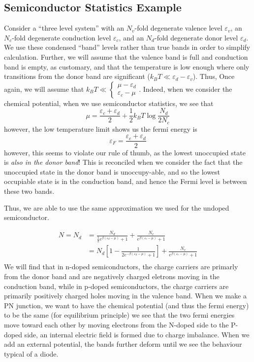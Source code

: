 \subsection{Semiconductor Statistics Example}
Consider a ``three level system'' with an \(N_v\)-fold degenerate valence level \(\varepsilon_v\), an \(N_c\)-fold degenerate conduction level \(\varepsilon_c\), and an \(N_d\)-fold degenerate donor level \(\varepsilon_d\). We use these condensed ``band'' levels rather than true bands in order to simplify calculation. Further, we will assume that the valence band is full and conduction band is empty, as customary, and that the temperature is low enough where only transitions from the donor band are significant (\(k_BT\ll\varepsilon_d-\varepsilon_v\)). Thus,
Once again, we will assume that \(k_BT\ll \begin{cases}
			\mu-\varepsilon_d\\
			\varepsilon_c-\mu
	\end{cases}\). Indeed, when we consider the chemical potential, when we use semiconductor statistics, we see that
	\[\mu = \frac{\varepsilon_c+\varepsilon_d}{2}+\frac{1}{2}k_BT\log\frac{N_d}{2N_c}\]
	however, the low temperature limit shows us the fermi energy is 
	\[\varepsilon_F = \frac{\varepsilon_c+\varepsilon_d}{2}\]
	however, this seems to violate our rule of thumb, as the lowest unoccupied state is \emph{also in the donor band}! This is reconciled when we consider the fact that the unoccupied state in the donor band is unoccupy-able, and so the lowest occupiable state is in the conduction band, and hence the Fermi level is between these two bands.
	
	Thus, we are able to use the same approximation we used for the undoped semiconductor.

\begin{align*}
	N = N_d &= \frac{N_d}{\frac{1}{2}e^{\beta(\varepsilon_d-\mu)}+1} + \frac{N_c}{e^{\beta(\varepsilon_c-\mu)}+1}\\
		&=N_d\left[1-\frac{1}{2e^{-\beta (\varepsilon_d-\mu)}+1}\right]+\frac{N_c}{e^{\beta(\varepsilon_c-\mu)}+1}\\
\end{align*}
We will find that in n-doped semiconductors, the charge carriers are primarly from the donor band and are negatively charged eletrons moving in the conduction band, while in p-doped semiconductors, the charge carriers are primarily positively charged holes moving in the valence band. When we make a PN junction, we want to have the chemical potential (and thus the fermi energy) to be the same (for equilibrium principle) we see that the two fermi energies move toward each other by moving electrons from the N-doped side to the P-doped side, an internal electric field is formed due to charge imbalance. When we add an external potential, the bands further deform until we see the behaviour typical of a diode.
